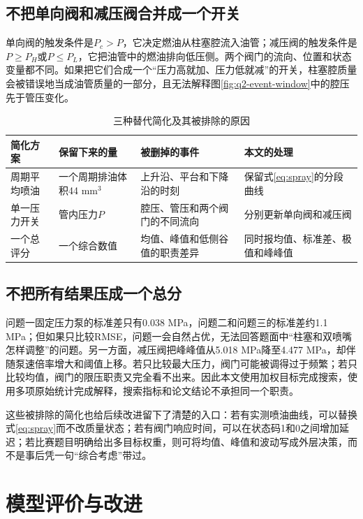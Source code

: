 \documentclass[UTF8,11pt,a4paper]{ctexart}
\begin{document}
\subsection{不把单向阀和减压阀合并成一个开关}

单向阀的触发条件是$P_c>P$，它决定燃油从柱塞腔流入油管；减压阀的触发条件是$P\geq P_H$或$P\leq P_L$，它把油管中的燃油排向低压侧。两个阀门的流向、位置和状态变量都不同。如果把它们合成一个“压力高就加、压力低就减”的开关，柱塞腔质量会被错误地当成油管质量的一部分，且无法解释图\ref{fig:q2-event-window}中的腔压先于管压变化。

\begin{table}[H]
\centering
\caption{三种替代简化及其被排除的原因}
\label{tab:excluded-simplifications-a}
\small
\begin{tabularx}{\textwidth}{p{3.1cm}p{3.7cm}p{4.4cm}X}
\toprule
简化方案 & 保留下来的量 & 被删掉的事件 & 本文的处理\\
\midrule
周期平均喷油 & 一个周期排油体积44 mm$^3$ & 上升沿、平台和下降沿的时刻 & 保留式\eqref{eq:spray}的分段曲线\\
单一压力开关 & 管内压力$P$ & 腔压、管压和两个阀门的不同流向 & 分别更新单向阀和减压阀\\
一个总评分 & 一个综合数值 & 均值、峰值和低侧谷值的职责差异 & 同时报均值、标准差、极值和峰峰值\\
\bottomrule
\end{tabularx}
\end{table}

\subsection{不把所有结果压成一个总分}

问题一固定压力泵的标准差只有0.038 MPa，问题二和问题三的标准差约1.1 MPa；但如果只比较RMSE，问题一会自然占优，无法回答题面中“柱塞和双喷嘴怎样调整”的问题。另一方面，减压阀把峰峰值从5.018 MPa降至4.477 MPa，却伴随泵速倍率增大和阈值上移。若只比较最大压力，阀门可能被调得过于频繁；若只比较均值，阀门的限压职责又完全看不出来。因此本文使用加权目标完成搜索，使用多项原始统计完成解释，搜索指标和论文结论不承担同一个职责。

这些被排除的简化也给后续改进留下了清楚的入口：若有实测喷油曲线，可以替换式\eqref{eq:spray}而不改质量状态；若有阀门响应时间，可以在状态码1和0之间增加延迟；若比赛题目明确给出多目标权重，则可将均值、峰值和波动写成外层决策，而不是事后凭一句“综合考虑”带过。

\section{模型评价与改进}
\end{document}
